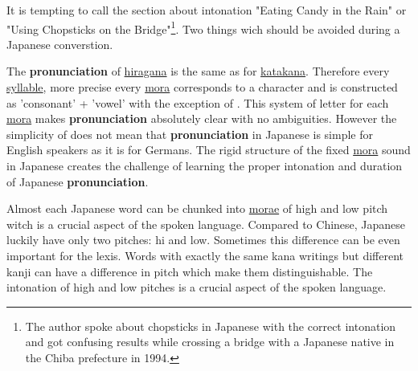 It is tempting to call the section about intonation "Eating Candy in the Rain"
or "Using Chopsticks on the Bridge"\footnote{The author spoke about chopsticks
in Japanese with the correct intonation and got confusing results while
crossing a bridge with a Japanese native in the Chiba prefecture in 1994.}. Two
things wich should be avoided during a Japanese converstion.


The \textbf{pronunciation} of \hyperref[sec:Hiragana]{hiragana} is the same as
for \hyperref[sec:Katakana]{katakana}. Therefore every
\hyperref[sec:Syllable]{syllable}, more precise every \hyperref[sec:Mora]{mora}
corresponds to a \hyperref[sec:\jscript]{\jtopic} character and is constructed
as 'consonant' + 'vowel' with the exception of . This system of letter for
each \hyperref[sec:Mora]{mora} makes \textbf{pronunciation} absolutely clear
with no ambiguities. However the simplicity of \hyperref[sec:\jscript]{\jtopic}
does not mean that \textbf{pronunciation} in Japanese is simple for English
speakers as it is for Germans. The rigid structure of the fixed
\hyperref[sec:Mora]{mora} sound in Japanese creates the challenge of learning
the proper intonation and duration of Japanese \textbf{pronunciation}.

Almost each Japanese word can be chunked into \hyperref[sec:Mora]{morae} of
high and low pitch witch is a crucial aspect of the spoken language. Compared
to Chinese, Japanese luckily have only two pitches: hi and low. Sometimes this
difference can be even important for the lexis. Words with exactly the same
kana writings but different kanji can have
a difference in pitch which make them distinguishable. The intonation of high
and low pitches is a crucial aspect of the spoken language.

